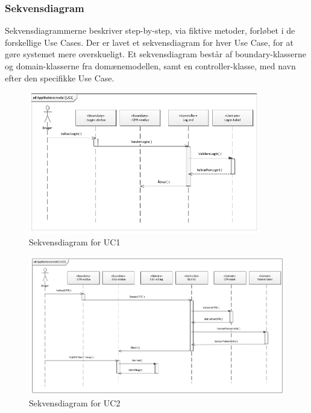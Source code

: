 \subsubsection{Sekvensdiagram}
Sekvensdiagrammerne beskriver step-by-step, via fiktive metoder, forløbet i de forskellige Use Cases. Der er lavet et sekvensdiagram for hver Use Case, for at gøre systemet mere overskueligt. Et sekvensdiagram består af boundary-klasserne og domain-klasserne fra domænemodellen, samt en controller-klasse, med navn efter den specifikke Use Case.  

\begin{figure}[H]
	\centering
	\includegraphics[width=0.9\textwidth]{Figurer/Snip20150429_34}
	\caption{Sekvensdiagram for UC1}
\end{figure}

\begin{figure}[H]
	\centering
	\includegraphics[width=1\textwidth]{Figurer/Snip20150429_33}
	\caption{Sekvensdiagram for UC2}
\end{figure}

